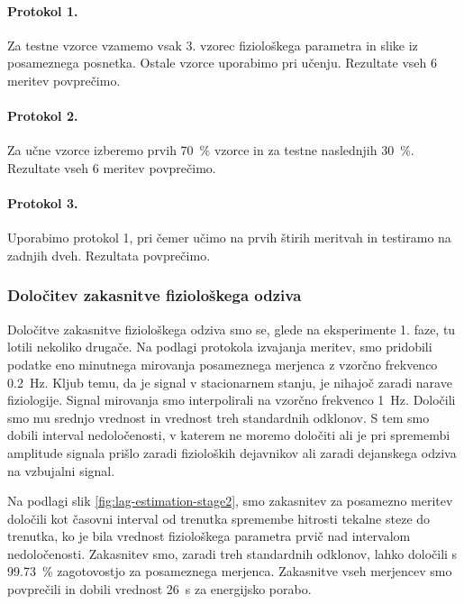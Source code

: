 \paragraph{Protokol 1.}
Za testne vzorce vzamemo vsak 3. vzorec fiziološkega parametra in slike iz posameznega posnetka. Ostale vzorce uporabimo pri učenju. Rezultate vseh 6 meritev povprečimo.

\paragraph{Protokol 2.}
Za učne vzorce izberemo prvih \SI{70}{\%} vzorce in za testne naslednjih \SI{30}{\%}. Rezultate vseh 6 meritev povprečimo.

\paragraph{Protokol 3.}
Uporabimo protokol 1, pri čemer učimo na prvih štirih meritvah in testiramo na zadnjih dveh. Rezultata povprečimo.

\subsubsection{Določitev zakasnitve fiziološkega odziva}
Določitve zakasnitve fiziološkega odziva smo se, glede na eksperimente 1. faze, tu lotili nekoliko drugače. Na podlagi protokola izvajanja meritev, smo pridobili podatke eno minutnega mirovanja posameznega merjenca z vzorčno frekvenco \SI{0.2}{\hertz}. Kljub temu, da je signal v stacionarnem stanju, je nihajoč zaradi narave fiziologije. Signal mirovanja smo interpolirali na vzorčno frekvenco \SI{1}{\hertz}. Določili smo mu srednjo vrednost in vrednost treh standardnih odklonov. S tem smo dobili interval nedoločenosti, v katerem ne moremo določiti ali je pri spremembi amplitude signala prišlo zaradi fizioloških dejavnikov ali zaradi dejanskega odziva na vzbujalni signal. 

Na podlagi slik \ref{fig:lag-estimation-stage2}, smo zakasnitev za posamezno meritev določili kot časovni interval od trenutka spremembe hitrosti tekalne steze do trenutka, ko je bila vrednost fiziološkega parametra prvič nad intervalom nedoločenosti. Zakasnitev smo, zaradi treh standardnih odklonov, lahko določili s \SI{99.73}{\%} zagotovostjo za posameznega merjenca. Zakasnitve vseh merjencev smo povprečili in dobili vrednost \SI{26}{\s} za energijsko porabo.

